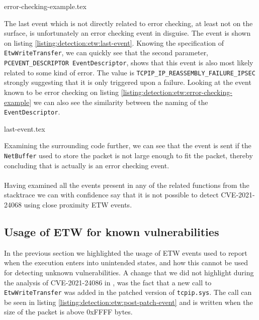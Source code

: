 \documentclass{report}
\begin{document}
{error-checking-example.tex}

The last event which is not directly related to error checking, at least not on the surface, is unfortunately an error checking event in disguise. The event is shown on listing \ref{listing:detection:etw:last-event}. Knowing the specification of \texttt{EtwWriteTransfer}\cite{url:etw:etwwritetransfer-api}, we can quickly see that the second parameter, \texttt{PCEVENT_DESCRIPTOR EventDescriptor}, shows that this event is also most likely related to some kind of error\cite{url:etw:etwwritetransfer-api}. The value is \texttt{TCPIP_IP_REASSEMBLY_FAILURE_IPSEC}\cite{url:etw:etw-event-descriptor} strongly suggesting that it is only triggered upon a failure. Looking at the event known to be error checking on listing \ref{listing:detection:etw:error-checking-example} we can also see the similarity between the naming of the \texttt{EventDescriptor}.

{last-event.tex}

Examining the surrounding code further, we can see that the event is sent if the \texttt{NetBuffer} used to store the packet is not large enough to fit the packet, thereby concluding that is actually is an error checking event.
\\
\\
Having examined all the events present in any of the related functions from the stacktrace we can with confidence say that it is not possible to detect CVE-2021-24068 using close proximity \gls{ETW} events.


\subsection{Usage of \gls{ETW} for known vulnerabilities} 
In the previous section we highlighted the usage of \gls{ETW} events used to report when the execution enters into unintended states, and how this cannot be used for detecting unknown vulnerabilities. A change that we did not highlight during the analysis of CVE-2021-24086 in , was the fact that a new call to \texttt{EtwWriteTransfer} was added in the patched version of \texttt{tcpip.sys}. The call can be seen in listing \ref{listing:detection:etw:post-patch-event} and is written when the size of the packet is above 0xFFFF bytes.
\end{document}
